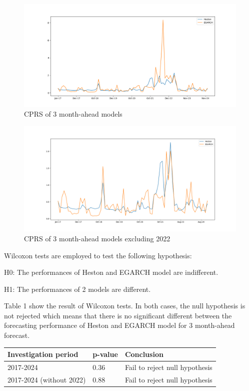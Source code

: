 \documentclass[12pt,a4paper]{article}
\numberwithin{equation}{section}
\begin{document}
\begin{figure}[h!] 
\includegraphics[scale=1,width=1\linewidth,height=0.4\textheight]{threemonthahead.png}
\caption{CPRS of 3 month-ahead models}
\label{3M}
\end{figure}

\begin{figure}[h!] 
\includegraphics[scale=1,width=1\linewidth,height=0.4\textheight]{m3_without22.png}
\caption{CPRS of 3 month-ahead models excluding 2022}
\label{3Mwithout22}
\end{figure}

Wilcoxon tests are employed to test the following hypothesis:

H0: The performances of Heston and EGARCH model are indifferent.

H1: The performances of 2 models are different.

Table 1 show the result of Wilcoxon tests. In both cases, the null hypothesis is not rejected which means that there is no significant different between the forecasting performance of Heston and EGARCH model for 3 month-ahead forecast.


\begin{table}[h!]
\centering
\begin{tabular}{@{}lll@{}}
\toprule
Investigation period     & p-value & Conclusion                     \\ \midrule
2017-2024                & 0.36    & Fail to reject null hypothesis \\
2017-2024 (without 2022) & 0.88    & Fail to reject null hypothesis \\ \bottomrule
\end{tabular}
\end{table}
\end{document}
